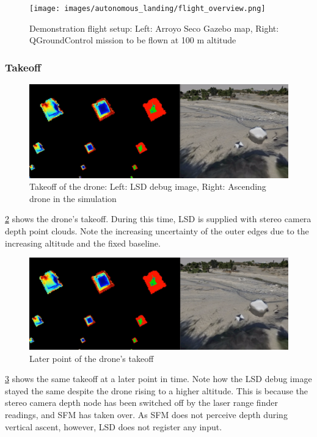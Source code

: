 \begin{figure}[h]
\centering
\texttt{[image: images/autonomous\_landing/flight\_overview.png]}
\caption{Demonstration flight setup: Left: Arroyo Seco Gazebo map, Right: QGroundControl mission to be flown at 100 m altitude}
\label{fig:demo_flight_setup}
\end{figure}

\subsubsection{Takeoff}

\begin{figure}[h]
\centering
\includegraphics[scale=0.27]{images/autonomous_landing/demo_flight/takeoff1.png}
\caption{Takeoff of the drone: Left: LSD debug image, Right: Ascending drone in the simulation}
\label{fig:demo_takeoff1}
\end{figure}

\cref{fig:demo_takeoff1} shows the drone's takeoff. During this time, LSD is supplied with stereo camera depth point clouds. Note the increasing uncertainty of the outer edges due to the increasing altitude and the fixed baseline.

\begin{figure}[h]
\centering
\includegraphics[scale=0.27]{images/autonomous_landing/demo_flight/takeoff2.png}
\caption{Later point of the drone's takeoff}
\label{fig:demo_takeoff2}
\end{figure}

\cref{fig:demo_takeoff2} shows the same takeoff at a later point in time. Note how the LSD debug image stayed the same despite the drone rising to a higher altitude. This is because the stereo camera depth node has been switched off by the laser range finder readings, and SFM has taken over. As SFM does not perceive depth during vertical ascent, however, LSD does not register any input.

